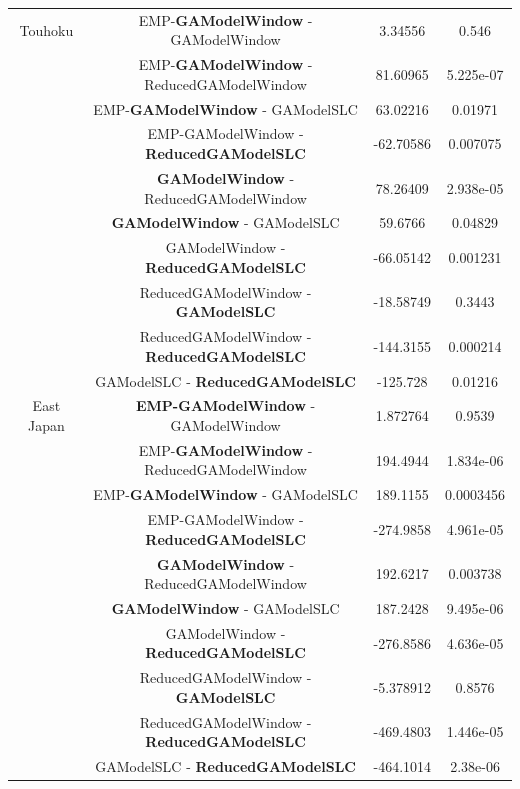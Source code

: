 \begin{table}[!htb]
\begin{center}
\begin{tabular}{|c|c|c|c|}
			\hline
			Touhoku & EMP-\textbf{GAModelWindow} - GAModelWindow &
			3.34556 & 0.546\\
			& EMP-\textbf{GAModelWindow} - ReducedGAModelWindow &
			81.60965 & 5.225e-07\\
			&	EMP-\textbf{GAModelWindow} - GAModelSLC &
			63.02216 &0.01971\\
			& EMP-GAModelWindow - \textbf{ReducedGAModelSLC} &
			-62.70586 & 0.007075\\
			& \textbf{GAModelWindow} - ReducedGAModelWindow & 
			78.26409 & 2.938e-05\\
			& \textbf{GAModelWindow} - GAModelSLC &
			59.6766 & 0.04829\\
			& GAModelWindow - \textbf{ReducedGAModelSLC} &
			-66.05142 &0.001231\\
			& ReducedGAModelWindow - \textbf{GAModelSLC} &
			-18.58749 & 0.3443\\
			& ReducedGAModelWindow - \textbf{ReducedGAModelSLC} &
			-144.3155 & 0.000214\\
			& GAModelSLC - \textbf{ReducedGAModelSLC} &
			-125.728 &0.01216\\

			
			\hline
			East Japan & \textbf{EMP-GAModelWindow} - GAModelWindow &
			1.872764  & 0.9539\\

			& EMP-\textbf{GAModelWindow} - ReducedGAModelWindow &
			194.4944 & 1.834e-06\\
			& EMP-\textbf{GAModelWindow} - GAModelSLC &
			189.1155 & 0.0003456\\
			& EMP-GAModelWindow - \textbf{ReducedGAModelSLC} &
			-274.9858 & 4.961e-05\\
			& \textbf{GAModelWindow} - ReducedGAModelWindow &
			192.6217 & 0.003738\\
			& \textbf{GAModelWindow} - GAModelSLC &
			187.2428 &9.495e-06\\
			& GAModelWindow - \textbf{ReducedGAModelSLC} &
			-276.8586 & 4.636e-05\\
			& ReducedGAModelWindow - \textbf{GAModelSLC} & 
			-5.378912 & 0.8576\\
			& ReducedGAModelWindow - \textbf{ReducedGAModelSLC} &
			-469.4803 & 1.446e-05\\
			& GAModelSLC - \textbf{ReducedGAModelSLC} &
			-464.1014  & 2.38e-06\\


\end{tabular}
\end{center}
\end{table}
